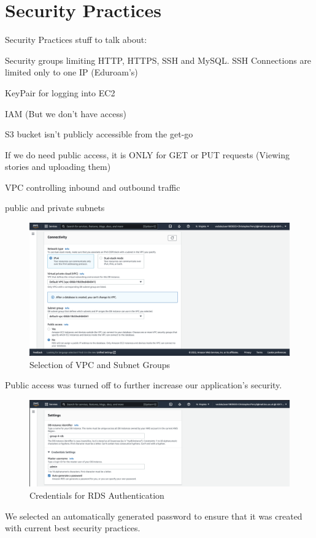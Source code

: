 \chapter{Security Practices}\label{ch:security-practices}
Security Practices stuff to talk about:

Security groups limiting HTTP, HTTPS, SSH and MySQL. SSH Connections are limited only to one IP (Eduroam's)

KeyPair for logging into EC2

IAM (But we don't have access)

S3 bucket isn't publicly accessible from the get-go

If we do need public access, it is ONLY for GET or PUT requests (Viewing stories and uploading them)

VPC controlling inbound and outbound traffic

public and private subnets

\begin{figure}[!htbp]
    \centering
    \includegraphics[width=\textwidth]{resources/rds/rds-connectivity-1.png}
    \caption{Selection of VPC and Subnet Groups}
    \label{fig:rds-connect-2}
\end{figure}

Public access was turned off to further increase our application's security.

\begin{figure}
    \centering
    \includegraphics[width=\textwidth]{resources/rds/rds-settings.png}
    \caption{Credentials for RDS Authentication}
    \label{fig:rds-settings-2}
\end{figure}

We selected an automatically generated password to ensure that it was created with current best security practices.